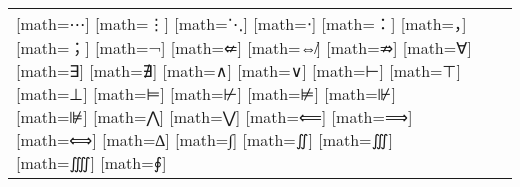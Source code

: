 \documentclass{unittest}
\begin{document}
\begin{tabular}{lcc}
\makerow{⋯}[math=⋯]
\makerow{⋮}[math=⋮]
\makerow{⋱}[math=⋱]
\makerow{⋅}[math=⋅]
\makerow{：}[math=：]
\makerow{，}[math=，]
\makerow{；}[math=；]
\midrule%
\makerow{¬}[math=¬]
\makerow{⇍}[math=⇍]
\makerow{⇎}[math=⇎]
\makerow{⇏}[math=⇏]
\makerow{∀}[math=∀]
\makerow{∃}[math=∃]
\makerow{∄}[math=∄]
\makerow{∧}[math=∧]
\makerow{∨}[math=∨]
\makerow{⊢}[math=⊢]
\makerow{⊤}[math=⊤]
\makerow{⊥}[math=⊥]
\makerow{⊨}[math=⊨]
\makerow{⊬}[math=⊬]
\makerow{⊭}[math=⊭]
\makerow{⊮}[math=⊮]
\makerow{⊯}[math=⊯]
\makerow{⋀}[math=⋀]
\makerow{⋁}[math=⋁]
\makerow{⟸}[math=⟸]
\makerow{⟹}[math=⟹]
\makerow{⟺}[math=⟺]
\midrule%
\makerow{∆}[math=∆]
\makerow{∫}[math=∫]
\makerow{∬}[math=∬]
\makerow{∭}[math=∭]
\makerow{⨌}[math=⨌]
\makerow{∮}[math=∮]
\bottomrule
\end{tabular}
\end{document}
